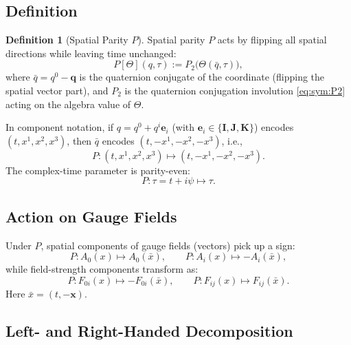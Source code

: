 \documentclass[12pt,a4paper]{article}
\theoremstyle{definition}
\newtheorem{definition}[theorem]{Definition}
\theoremstyle{remark}
\begin{document}
\subsection{Definition}

\begin{definition}[Spatial Parity $P$]
\label{def:sym:P}
Spatial parity $P$ acts by flipping all spatial directions while
leaving time unchanged:
\begin{equation}
  P[\Theta](q,\tau)
  := P_2\!\bigl(\Theta(\bar{q},\tau)\bigr),
  \label{eq:sym:P_field}
\end{equation}
where $\bar{q} = q^0 - \mathbf{q}$ is the quaternion conjugate of the
coordinate (flipping the spatial vector part), and $P_2$ is the quaternion
conjugation involution \eqref{eq:sym:P2} acting on the algebra value
of $\Theta$.

In component notation, if
$q = q^0 + q^i \mathbf{e}_i$ (with $\mathbf{e}_i \in \{\mathbf{I},
\mathbf{J}, \mathbf{K}\}$) encodes $(t, x^1, x^2, x^3)$, then
$\bar{q}$ encodes $(t, -x^1, -x^2, -x^3)$, i.e.,
\begin{equation}
  P: (t, x^1, x^2, x^3) \mapsto (t, -x^1, -x^2, -x^3).
  \label{eq:sym:P_spacetime}
\end{equation}
The complex-time parameter is parity-even:
\begin{equation}
  P: \tau = t + i\psi \mapsto \tau.
  \label{eq:sym:P_tau}
\end{equation}
\end{definition}

\subsection{Action on Gauge Fields}

Under $P$, spatial components of gauge fields (vectors) pick up a sign:
\begin{equation}
  P: A_0(x) \mapsto A_0(\bar{x}),
  \qquad
  P: A_i(x) \mapsto -A_i(\bar{x}),
  \label{eq:sym:P_gauge}
\end{equation}
while field-strength components transform as:
\begin{equation}
  P: F_{0i}(x) \mapsto -F_{0i}(\bar{x}),
  \qquad
  P: F_{ij}(x) \mapsto F_{ij}(\bar{x}).
  \label{eq:sym:P_Fmunu}
\end{equation}
Here $\bar{x} = (t, -\mathbf{x})$.

\subsection{Left- and Right-Handed Decomposition}
\end{document}
